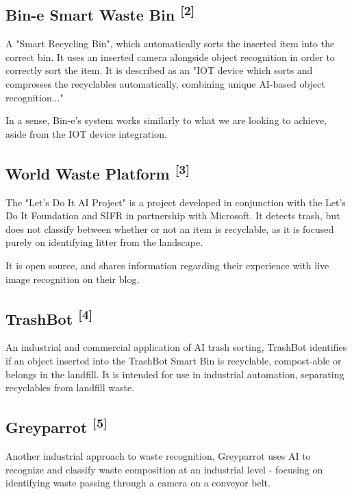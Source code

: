 \documentclass[conference]{IEEEtran}
\begin{document}
\subsection{Bin-e Smart Waste Bin \textsuperscript{[2]}}

A "Smart Recycling Bin", which automatically sorts the inserted item into the correct bin. It uses an inserted camera alongside object recognition in order to correctly sort the item. It is described as an "IOT device which sorts and compresses the recyclables automatically, combining unique AI-based object recognition..."

In a sense, Bin-e's system works similarly to what we are looking to achieve, aside from the IOT device integration.
\newline

\subsection{World Waste Platform \textsuperscript{[3]}}

The "Let's Do It AI Project" is a project developed in conjunction with the Let's Do It Foundation and SIFR in partnership with Microsoft. It detects trash, but does not classify between whether or not an item is recyclable, as it is focused purely on identifying litter from the landscape. 

It is open source, and shares information regarding their experience with live image recognition on their blog.
\newline

\subsection{TrashBot \textsuperscript{[4]}}

An industrial and commercial application of AI trash sorting, TrashBot identifies if an object inserted into the TrashBot Smart Bin is recyclable, compost-able or belongs in the landfill. It is intended for use in industrial automation, separating recyclables from landfill waste. 
\newline

\subsection{Greyparrot \textsuperscript{[5]}}

Another industrial approach to waste recognition, Greyparrot uses AI to recognize and classify waste composition at an industrial level - focusing on identifying waste passing through a camera on a conveyor belt.
\end{document}

